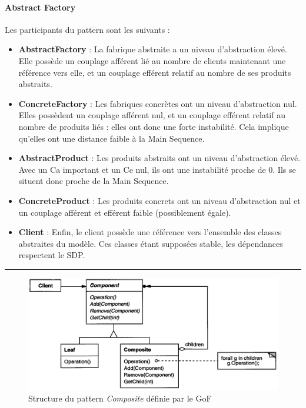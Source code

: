 \documentclass{scrartcl}
\begin{document}
    \paragraph{Abstract Factory}Les participants du pattern sont les suivants : 
    \begin{itemize}
        \item \textbf{AbstractFactory} : La fabrique abstraite a un niveau d'abstraction élevé. Elle possède un couplage afférent lié au nombre de clients maintenant une référence vers elle, et un couplage efférent relatif au nombre de ses produits abstraits.
        \item \textbf{ConcreteFactory} : Les fabriques concrètes ont un niveau d'abstraction nul. Elles possèdent un couplage afférent nul, et un couplage efférent relatif au nombre de produits liés : elles ont donc une forte instabilité. Cela implique qu'elles ont une distance faible à la Main Sequence.
        \item \textbf{AbstractProduct} : Les produits abstraits ont un niveau d'abstraction élevé. Avec un Ca important et un Ce nul, ils ont une instabilité proche de 0. Ils se situent donc proche de la Main Sequence.
        \item \textbf{ConcreteProduct} : Les produits concrets ont un niveau d'abstraction nul et un couplage afférent et efférent faible (possiblement égale).
        \item \textbf{Client} : Enfin, le client possède une référence vers l'ensemble des classes abstraites du modèle. Ces classes étant supposées stable, les dépendances respectent le SDP.
    \end{itemize}
    
    \vspace{2mm}\hrule
    
    \begin{figure}[H]
        \centering
        \includegraphics[scale=0.35]{img/pattern/composite.png}
        \caption{Structure du pattern \emph{Composite} définie par le GoF}
    \end{figure}
\end{document}
